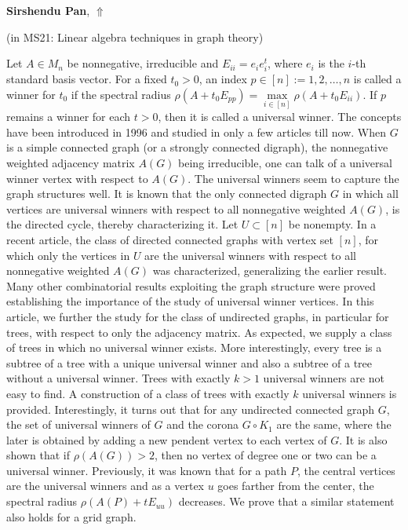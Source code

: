 \documentclass[ILAS2025-program.tex]{subfiles}
\begin{document}
\hypertarget{down0380}{}\begin{ilasabstract}
    
\textbf{Sirshendu Pan},  \hfill \hyperlink{up0380}{$\Uparrow$}
    
    
(in {\color{mstitle}MS21: Linear algebra techniques in graph theory})
        
\mtskip
    Let $A \in M_n$ be nonnegative, irreducible and $E_{ii}=e_ie_i^t$, where $e_i$ is the $i$-th standard basis vector. For a fixed $t_0>0$, an index $p \in [n]:={1,2,\ldots,n}$ is called a winner for $t_0$ if the spectral radius $\rho(A+t_0E_{pp})=\max\limits_{i\in [n]}\rho(A+t_0E_{ii})$. If $p$ remains a winner for each $t>0$, then it is called a universal winner. The concepts have been introduced in 1996 and studied in only a few articles till now. When $G$ is a simple connected graph (or a strongly connected digraph), the nonnegative weighted adjacency matrix $A(G)$ being irreducible, one can talk of a universal winner vertex with respect to $A(G)$. The universal winners seem to capture the graph structures well. It is known that the only connected digraph $G$ in which all vertices are universal winners with respect to all nonnegative weighted $A(G)$, is the directed cycle, thereby characterizing it. Let $U\subset [n]$ be nonempty. In a recent article, the class of directed connected graphs with vertex set $[n]$, for which only the vertices in $U$ are the universal winners with respect to all nonnegative weighted $A(G)$ was characterized, generalizing the earlier result. Many other combinatorial results exploiting the graph structure were proved establishing the importance of the study of universal winner vertices. In this article, we further the study for the class of undirected graphs, in particular for trees, with respect to only the adjacency matrix. As expected, we supply a class of trees in which no universal winner exists. More interestingly, every tree is a subtree of a tree with a unique universal winner and also a subtree of a tree without a universal winner. Trees with exactly $k>1$ universal winners are not easy to find. A construction of a class of trees with exactly $k$ universal winners is provided. Interestingly, it turns out that for any undirected connected graph $G$, the set of universal winners of $G$ and the corona $G\circ K_1$ are the same, where the later is obtained by adding a new pendent vertex to each vertex of $G$. It is also shown that if $\rho(A(G))>2$, then no vertex of degree one or two can be a universal winner. Previously, it was known that for a path $P$, the central vertices are the universal winners and as a vertex $u$ goes farther from the center, the spectral radius $\rho(A(P)+tE_{uu})$ decreases. We prove that a similar statement also holds for a grid graph.
\end{ilasabstract}
    
\end{document}
